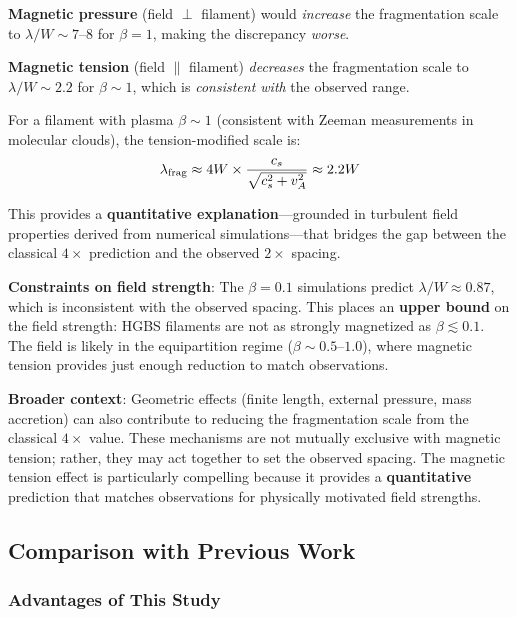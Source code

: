 \documentclass[11pt,a4paper]{article}
\begin{document}
\textbf{Magnetic pressure} (field $\perp$ filament) would \textit{increase} the fragmentation scale to $\lambda/W \sim 7$--$8$ for $\beta = 1$, making the discrepancy \textit{worse}.

\textbf{Magnetic tension} (field $\parallel$ filament) \textit{decreases} the fragmentation scale to $\lambda/W \sim 2.2$ for $\beta \sim 1$, which is \textit{consistent with} the observed range.

For a filament with plasma $\beta \sim 1$ (consistent with Zeeman measurements in molecular clouds), the tension-modified scale is:
\begin{equation}
\lambda_{\rm frag} \approx 4W \times \frac{c_s}{\sqrt{c_s^2 + v_A^2}} \approx 2.2W
\label{eq:tension2}
\end{equation}

This provides a \textbf{quantitative explanation}—grounded in turbulent field properties derived from numerical simulations—that bridges the gap between the classical $4\times$ prediction and the observed $2\times$ spacing.

\textbf{Constraints on field strength}: The $\beta = 0.1$ simulations predict $\lambda/W \approx 0.87$, which is inconsistent with the observed spacing. This places an \textbf{upper bound} on the field strength: HGBS filaments are not as strongly magnetized as $\beta \lesssim 0.1$. The field is likely in the equipartition regime ($\beta \sim 0.5$--$1.0$), where magnetic tension provides just enough reduction to match observations.

\textbf{Broader context}: Geometric effects (finite length, external pressure, mass accretion) can also contribute to reducing the fragmentation scale from the classical $4\times$ value. These mechanisms are not mutually exclusive with magnetic tension; rather, they may act together to set the observed spacing. The magnetic tension effect is particularly compelling because it provides a \textbf{quantitative} prediction that matches observations for physically motivated field strengths.

\subsection{Comparison with Previous Work}

\subsubsection{Advantages of This Study}
\end{document}
